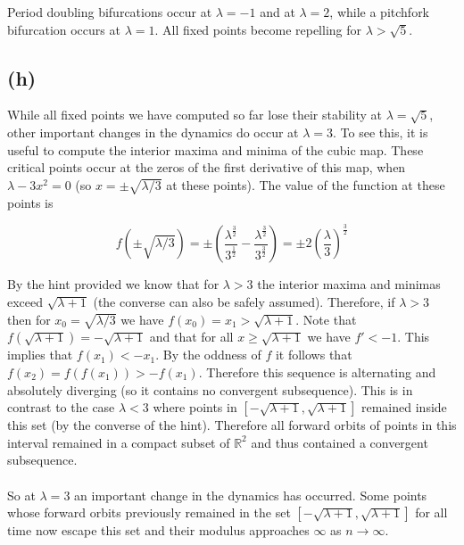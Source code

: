 \documentclass{article}
\begin{document}
Period doubling bifurcations occur at $\lambda = -1$ and at $\lambda = 2$, while a pitchfork 
bifurcation occurs at $\lambda = 1$. All fixed points become repelling for $\lambda > \sqrt{5}$.

\subsection*{(h)}
While all fixed points we have computed so far lose their stability at $\lambda = \sqrt{5}$, 
other important changes in the dynamics do occur at $\lambda = 3$. To see this, it is useful 
to compute the interior maxima and minima of the cubic map. These critical points occur at the zeros of the 
first derivative of this map, when $\lambda - 3x^2 = 0$ (so $x = \pm \sqrt{\lambda/3}$ at these 
points). The value of the function at these points is 

\begin{equation}
    f(\pm \sqrt{\lambda/3}) = \pm \left(\frac{\lambda^\frac{3}{2}}{3^\frac{1}{2}} - \frac{\lambda^\frac{3}{2}}{3^\frac{3}{2}}\right) = \pm 2\left(\frac{\lambda}{3} \right)^\frac{3}{2} 
\end{equation}

By the hint provided we know that for $\lambda > 3$ the interior maxima and minimas 
exceed $\sqrt{\lambda +1}$ (the converse can also be safely assumed). Therefore, if $\lambda > 3$ 
then for $x_0 = \sqrt{\lambda/3}$ we have $f(x_0) = x_1 > \sqrt{\lambda+1}$. Note that $f(\sqrt{\lambda + 1}) = -\sqrt{\lambda + 1}$ 
and that for all $x \geq \sqrt{\lambda+1}$ we have $f' < -1$. This implies that $f(x_1) < -x_1$. By the oddness of $f$ 
it follows that $f(x_2) = f(f(x_1)) > -f(x_1)$. Therefore this sequence is 
alternating and absolutely diverging (so it contains no convergent subsequence). This is in 
contrast to the case $\lambda < 3$ where points in $[-\sqrt{\lambda +1},\sqrt{\lambda + 1}]$ remained 
inside this set (by the converse of the hint). Therefore all forward orbits of points in this 
interval remained in a compact subset of $\mathbb{R}^2$ and thus contained a convergent subsequence.

\paragraph{}
So at $\lambda = 3$ an important change in the dynamics has occurred. Some points whose forward 
orbits previously 
remained in the set $[-\sqrt{\lambda + 1},\sqrt{\lambda + 1}]$ for all time now escape this set 
and their modulus approaches $\infty$ as $n \rightarrow \infty$.
\end{document}

